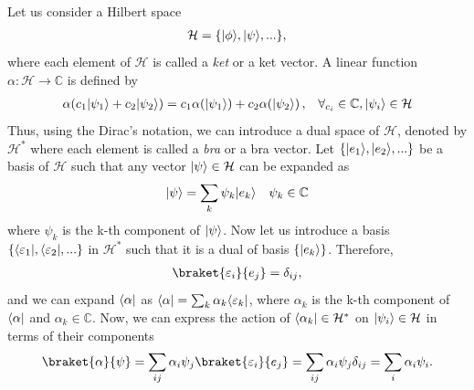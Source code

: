 \documentclass{article}
\begin{document}
Let us consider a Hilbert space
\begin{align}
  \mathcal{H}=\{\lvert\phi\rangle, \lvert\psi\rangle,... \},
\end{align}
where each element of $\mathcal{H}$ is called a \textit{ket} or a ket vector. A linear function  $\alpha:\mathcal{H}\rightarrow \mathbb{C}$ is defined by
\begin{align}
  \alpha( c_1 \lvert\psi_1\rangle + c_2\lvert\psi_2\rangle) = c_1\alpha (\lvert\psi_1\rangle) + c_2\alpha (\lvert\psi_2\rangle)\,,& & \forall_{c_i} \in \mathbb{C},\lvert\psi_i\rangle \in \mathcal{H} 
\end{align}
Thus, using the Dirac's notation, we can introduce a dual space of $\mathcal{H}$, denoted by $\mathcal{H}^*$ where each element is called a \textit{bra} or a bra vector.
Let $\{\lvert e_1\rangle,\lvert e_2\rangle,...\}$ be a basis of $\mathcal{H}$ such that any vector $\lvert\psi\rangle \in \mathcal{H}$ can be expanded as
\begin{align}
  \lvert\psi\rangle = \sum_k \psi_k\lvert e_k\rangle && \psi_k \in \mathbb{C}
\end{align}
where $\psi_k$ is the k-th component of $\lvert\psi\rangle$.
Now let us introduce a basis $\{\langle\varepsilon_1\rvert,\langle\varepsilon_2\rvert,...\}$ in $\mathcal{H}^*$ such that it is a dual of basis $\{\lvert e_k\rangle\}$. Therefore,
\begin{align}
  \braket{\varepsilon_i}{e_j}=\delta_{ij},
\end{align}
and we can expand $\langle\alpha\rvert$ as $\langle\alpha\rvert=\sum_k \alpha_k\langle\varepsilon_k\rvert$, where $\alpha_k$ is the k-th component of $\langle\alpha\rvert$ and $\alpha_k \in \mathbb{C}$. Now, we can express the action of $\langle\alpha_k\rvert \in \mathcal{H}^*$ on $\lvert\psi_i\rangle \in \mathcal{H}$ in terms of their components
\begin{align}
  \braket{\alpha}{\psi}=\sum_{ij}\alpha_i \psi_j\braket{\varepsilon_i}{e_j} = \sum_{ij}\alpha_i \psi_j\delta_{ij} = \sum_{i}\alpha_i \psi_i.
\end{align}
\end{document}
